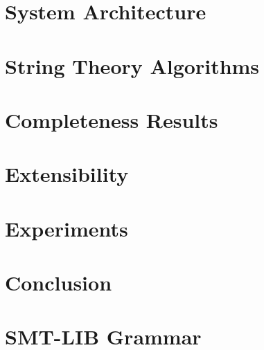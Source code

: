 \documentclass{fmcad}
\begin{document}
	\section{System Architecture}\label{sec:architecture}
	

	\section{String Theory Algorithms}\label{sec:string-theory-algorithms}
	

	\section{Completeness Results}\label{sec:completeness}
	

	\section{Extensibility}\label{sec:extensibility}
	

	\section{Experiments}\label{sec:experiments}
	

	\section{Conclusion}\label{sec:conclusion}
	

	

	
	
	\appendix
	
	\section{SMT-LIB Grammar}
	
\end{document}
